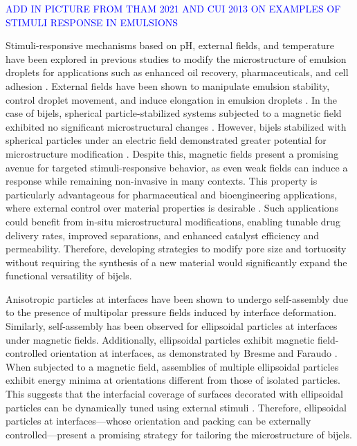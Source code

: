 \textcolor{blue}{ADD IN PICTURE FROM THAM 2021 AND CUI 2013 ON EXAMPLES OF STIMULI RESPONSE IN EMULSIONS}

Stimuli-responsive mechanisms based on pH, external fields, and temperature have been explored in previous studies to modify the microstructure of emulsion 
droplets for applications such as enhanced oil recovery, pharmaceuticals, and cell adhesion 
\cite{haase_nanoparticle_2011, tham_magnetophoresis_2021, cui_stabilizing_2013, manfredini_limonene--water_2021}. External fields have been shown to 
manipulate emulsion stability, control droplet movement, and induce elongation in emulsion droplets 
\cite{tham_magnetophoresis_2021, cui_stabilizing_2013, melle_pickering_2005}.  
In the case of bijels, spherical particle-stabilized systems subjected to a magnetic field exhibited no significant microstructural changes 
\cite{kim_bijels_2010}. However, bijels stabilized with spherical particles under an electric field demonstrated greater potential for microstructure 
modification \cite{carmack_tuning_2018}. Despite this, magnetic fields present a promising avenue for targeted stimuli-responsive behavior, as even 
weak fields can induce a response while remaining non-invasive in many contexts. This property is particularly advantageous for pharmaceutical and 
bioengineering applications, where external control over material properties is desirable 
\cite{vanoli_bijels_2022, thorson_bijel-templated_2019, thorson_composite_2018}.  
Such applications could benefit from in-situ microstructural modifications, enabling tunable drug delivery rates, improved separations, and enhanced catalyst 
efficiency and permeability. Therefore, developing strategies to modify pore size and tortuosity without requiring the synthesis of a new material would 
significantly expand the functional versatility of bijels.  

Anisotropic particles at interfaces have been shown to undergo self-assembly due to the presence of multipolar pressure fields induced by interface 
deformation. Similarly, self-assembly has been observed for ellipsoidal particles at interfaces under magnetic fields. Additionally, ellipsoidal particles 
exhibit magnetic field-controlled orientation at interfaces, as demonstrated by Bresme and Faraudo \cite{bresme_orientational_2007, davies_interface_2014}.  
When subjected to a magnetic field, assemblies of multiple ellipsoidal particles exhibit energy minima at orientations different from those of isolated 
particles. This suggests that the interfacial coverage of surfaces decorated with ellipsoidal particles can be dynamically tuned using external 
stimuli \cite{newton_influence_2014, newton_capillary_2018}. Therefore, ellipsoidal particles at interfaces—whose orientation and packing can be externally 
controlled—present a promising strategy for tailoring the microstructure of bijels.  


